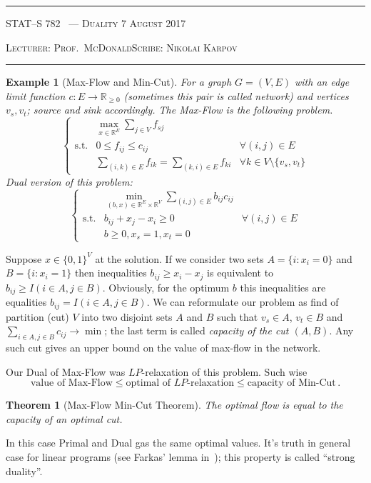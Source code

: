 \documentclass[10pt]{article}
\newcounter{lecnum}
\newtheorem{theorem}{Theorem}[lecnum]
\newtheorem{example}[ex]{Example}
\newcommand{\R}{\mathbb{R}}
\newcommand{\lecturer}{Prof.\ McDonald}
\newcommand{\scribe}{Nikolai Karpov}
\newcommand{\chtitle}{Duality}
\newcommand{\lecdate}{7 August 2017}
\begin{document}
\rule{6.5in}{1pt}

\textsc{STAT--S 782
        \hfill \thelecnum\ --- \chtitle
        \hfill \lecdate}

\textsc{Lecturer: \lecturer \hfill Scribe: \scribe}
\rule{6.5in}{1pt}

\begin{example}[Max-Flow and Min-Cut]
	For a graph $G = (V, E)$ with an edge limit function $c : E \rightarrow \R_{\geq 0}$ (sometimes this pair is called network) and vertices $v_s, v_t$; source and sink
	accordingly. The Max-Flow is the following problem.
	\[\left\{
	\begin{array}{lll}
	& \max\limits_{x \in \R^E} {\sum\limits_{j \in V}f_{sj}} \\
	\text{s.t.} &  0 \leq f_{ij} \leq c_{ij} & \forall (i, j) \in E \\
	& \sum\limits_{(i, k) \in E} f_{ik} = \sum\limits_{(k, i) \in E} f_{ki} & \forall k \in V \setminus \{v_s, v_t\}
	\end{array}
	\right.
	\]
	Dual version of this problem:
	\[
	\left\{
	\begin{array}{lll}
	&\min\limits_{(b, x) \in \R^E\times \R^V}\sum\limits_{(i, j) \in E}b_{ij}c_{ij} \\
	\text{s.t.} & b_{ij}+x_j-x_i \geq 0 & \forall (i, j) \in E \\
	& b \geq 0, x_s = 1, x_t = 0
	\end{array}
	\right.
	\]
\end{example}
	Suppose $x \in \{0, 1\}^V$ at the solution. If we consider two sets
	$A = \{i : x_i = 0\}$ and $B = \{i : x_i = 1\}$ then inequalities
	$b_{ij} \geq x_i - x_j$ is equivalent to $b_{ij} \geq I(i \in A, j \in B)$. Obviously, for the optimum $b$ this inequalities are equalities $b_{ij} = I(i \in A, j \in B)$. We can reformulate our problem as find of partition (cut) $V$ into two disjoint sets $A$ and $B$ such that $v_s \in A$, $v_t \in B$ and $\sum\limits_{i \in A, j \in B}c_{ij} \rightarrow \min$; the last term is called \emph{capacity of the cut $(A, B)$}. Any such cut gives an upper bound on the value of max-flow in the network.
	
	Our Dual of Max-Flow was $LP$-relaxation of this problem. Such wise $$\text{value of Max-Flow} \leq \text{optimal of }LP\text{-relaxation} \leq \text{capacity of Min-Cut}\,.$$
	\begin{theorem}[Max-Flow Min-Cut Theorem] The optimal flow is equal to the capacity of an optimal cut.
	\end{theorem}
	In this case Primal and Dual gas the same optimal values. It's truth in general case for linear programs (see Farkas' lemma in~\cite{boyd2004convex}); this property is called ``strong duality''.
\end{document}
